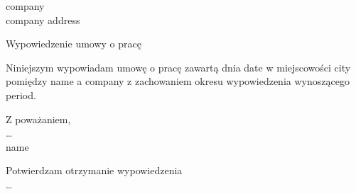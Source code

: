 \documentclass[a4paper]{letter}
\def\Name{name}
\def\CompanyName{company}
\def\CompanyAddress{company address}
\def\CompanyDetails{\CompanyName \\ \CompanyAddress}
\def\DateOfContract{date}
\def\CityOfContract{city}
\def\NoticePeriod{period}
\begin{document}
\begin{letter}{\CompanyDetails}
{
    \opening{\noindent Wypowiedzenie umowy o pracę}{}
        Niniejszym wypowiadam umowę o pracę zawartą dnia \DateOfContract{} %
        w miejscowości \CityOfContract{} pomiędzy \Name{} a \CompanyName{} z zachowaniem %
        okresu wypowiedzenia wynoszącego \NoticePeriod.
    \closing{Z poważaniem, \\ \ldots \\ \Name}}
{\noindent Potwierdzam otrzymanie wypowiedzenia \\ \ldots}

\end{letter}
\end{document}
